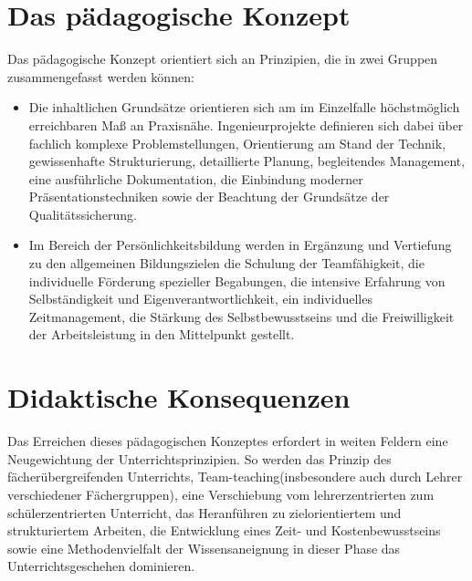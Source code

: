 \section{Das pädagogische Konzept}

Das pädagogische Konzept orientiert sich an Prinzipien, die in zwei Gruppen zusammengefasst werden können:

\begin{itemize}
	\item Die inhaltlichen Grundsätze orientieren sich am im Einzelfalle höchstmöglich erreichbaren Maß an Praxisnähe. Ingenieurprojekte definieren sich dabei über fachlich komplexe Problemstellungen, Orientierung am Stand der Technik, gewissenhafte Strukturierung, detaillierte Planung, begleitendes Management, eine ausführliche Dokumentation, die Einbindung moderner Präsentationstechniken sowie der Beachtung der Grundsätze der Qualitätssicherung.
	\item Im Bereich der Persönlichkeitsbildung werden in Ergänzung und Vertiefung zu den allgemeinen Bildungszielen die Schulung der Teamfähigkeit, die individuelle Förderung spezieller Begabungen, die intensive Erfahrung von Selbständigkeit und Eigenverantwortlichkeit, ein individuelles Zeitmanagement, die Stärkung des Selbstbewusstseins und die Freiwilligkeit der Arbeitsleistung in den Mittelpunkt gestellt.
	
\end{itemize}	
\section{Didaktische Konsequenzen}

Das Erreichen dieses pädagogischen Konzeptes erfordert in weiten Feldern eine Neugewichtung der Unterrichtsprinzipien. So werden das Prinzip des fächerübergreifenden Unterrichts, \glqq Team-teaching\grqq (insbesondere auch durch Lehrer verschiedener Fächergruppen), eine Verschiebung vom lehrerzentrierten zum schülerzentrierten Unterricht, das Heranführen zu zielorientiertem und strukturiertem Arbeiten, die Entwicklung eines Zeit- und Kostenbewusstseins sowie eine Methodenvielfalt der Wissensaneignung in dieser Phase das Unterrichtsgeschehen dominieren.

